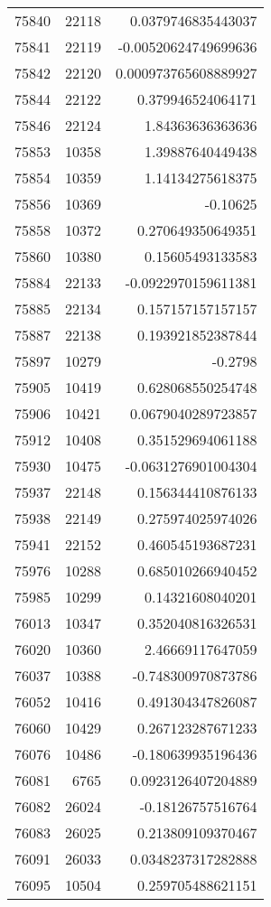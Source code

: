 \begin{tabular}{r | r | r}
75840 & 22118 & 0.0379746835443037 \\
75841 & 22119 & -0.00520624749699636 \\
75842 & 22120 & 0.000973765608889927 \\
75844 & 22122 & 0.379946524064171 \\
75846 & 22124 & 1.84363636363636 \\
75853 & 10358 & 1.39887640449438 \\
75854 & 10359 & 1.14134275618375 \\
75856 & 10369 & -0.10625 \\
75858 & 10372 & 0.270649350649351 \\
75860 & 10380 & 0.15605493133583 \\
75884 & 22133 & -0.0922970159611381 \\
75885 & 22134 & 0.157157157157157 \\
75887 & 22138 & 0.193921852387844 \\
75897 & 10279 & -0.2798 \\
75905 & 10419 & 0.628068550254748 \\
75906 & 10421 & 0.0679040289723857 \\
75912 & 10408 & 0.351529694061188 \\
75930 & 10475 & -0.0631276901004304 \\
75937 & 22148 & 0.156344410876133 \\
75938 & 22149 & 0.275974025974026 \\
75941 & 22152 & 0.460545193687231 \\
75976 & 10288 & 0.685010266940452 \\
75985 & 10299 & 0.14321608040201 \\
76013 & 10347 & 0.352040816326531 \\
76020 & 10360 & 2.46669117647059 \\
76037 & 10388 & -0.748300970873786 \\
76052 & 10416 & 0.491304347826087 \\
76060 & 10429 & 0.267123287671233 \\
76076 & 10486 & -0.180639935196436 \\
76081 & 6765 & 0.0923126407204889 \\
76082 & 26024 & -0.18126757516764 \\
76083 & 26025 & 0.213809109370467 \\
76091 & 26033 & 0.0348237317282888 \\
76095 & 10504 & 0.259705488621151 \\

\end{tabular}
